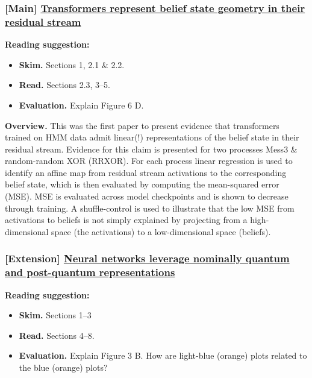 \documentclass[11pt]{article}
\begin{document}
\subsubsection{[Main] \href{https://arxiv.org/pdf/2405.15943}{Transformers represent belief state geometry in their residual stream}}\label{main-transformers-represent-belief-state-geometry-in-their-residual-stream}

\textbf{Reading suggestion:}

\begin{itemize}
\item
  \textbf{Skim.} Sections 1, 2.1 \& 2.2.
\item
  \textbf{Read.} Sections 2.3, 3--5.
\item
  \textbf{Evaluation.} Explain Figure 6 D.
\end{itemize}

\textbf{Overview.} This was the first paper to present evidence that transformers trained on HMM data admit linear(!) representations of the belief state in their residual stream. Evidence for this claim is presented for two processes Mess3 \& random-random XOR (RRXOR). For each process linear regression is used to identify an affine map from residual stream activations to the corresponding belief state, which is then evaluated by computing the mean-squared error (MSE). MSE is evaluated across model checkpoints and is shown to decrease through training. A shuffle-control is used to illustrate that the low MSE from activations to beliefs is not simply explained by projecting from a high-dimensional space (the activations) to a low-dimensional space (beliefs).

\subsubsection{[Extension] \href{https://arxiv.org/pdf/2507.07432}{Neural networks leverage nominally quantum and post-quantum representations}}\label{extension-neural-networks-leverage-nominally-quantum-and-post-quantum-representations}

\textbf{Reading suggestion:}

\begin{itemize}
\item
  \textbf{Skim.} Sections 1--3
\item
  \textbf{Read.} Sections 4--8.
\item
  \textbf{Evaluation.} Explain Figure 3 B. How are light-blue (orange) plots related to the blue (orange) plots?
\end{itemize}
\end{document}
